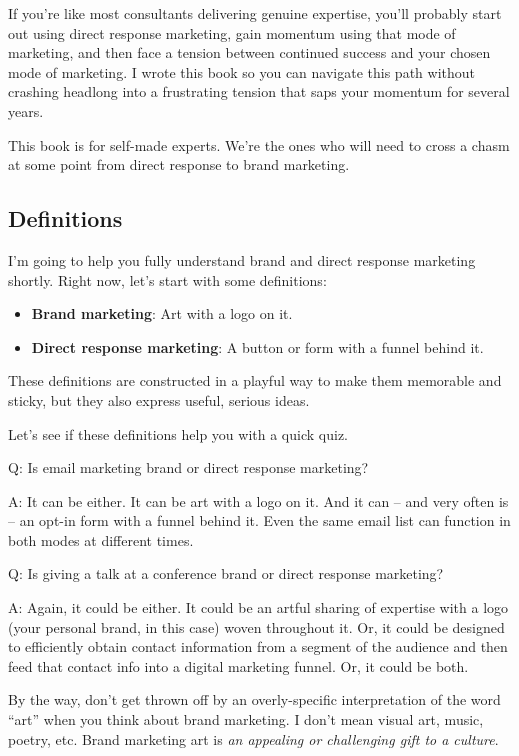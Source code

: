 \documentclass[13pt,]{tufte-handout}
\providecommand{\tightlist}{%
  \setlength{\itemsep}{0pt}\setlength{\parskip}{0pt}}
\begin{document}
If you're like most consultants delivering genuine expertise, you'll
probably start out using direct response marketing, gain momentum using
that mode of marketing, and then face a tension between continued
success and your chosen mode of marketing. I wrote this book so you can
navigate this path without crashing headlong into a frustrating tension
that saps your momentum for several years.

This book is for self-made experts. We're the ones who will need to
cross a chasm at some point from direct response to brand marketing.

\hypertarget{definitions}{%
\subsection{Definitions}\label{definitions}}

I'm going to help you fully understand brand and direct response
marketing shortly. Right now, let's start with some definitions:

\begin{itemize}
\tightlist
\item
  \textbf{Brand marketing}: Art with a logo on it.
\item
  \textbf{Direct response marketing}: A button or form with a funnel
  behind it.
\end{itemize}

These definitions are constructed in a playful way to make them
memorable and sticky, but they also express useful, serious ideas.

Let's see if these definitions help you with a quick quiz.

Q: Is email marketing brand or direct response marketing?

A: It can be either. It can be art with a logo on it. And it can -- and
very often is -- an opt-in form with a funnel behind it. Even the same
email list can function in both modes at different times.

Q: Is giving a talk at a conference brand or direct response marketing?

A: Again, it could be either. It could be an artful sharing of expertise
with a logo (your personal brand, in this case) woven throughout it. Or,
it could be designed to efficiently obtain contact information from a
segment of the audience and then feed that contact info into a digital
marketing funnel. Or, it could be both.

By the way, don't get thrown off by an overly-specific interpretation of
the word ``art'' when you think about brand marketing. I don't mean
visual art, music, poetry, etc. Brand marketing art is \emph{an
appealing or challenging gift to a culture}.
\end{document}
